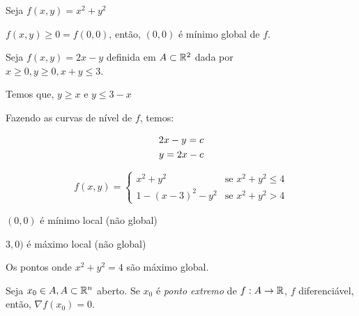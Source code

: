 \documentclass{book}
\begin{document}
\begin{ex}
Seja $f\left( {x,y} \right) = x^2  + y^2$
\end{ex}

\begin{sol}
$f\left( {x,y} \right) \geqslant 0 = f\left( {0,0} \right)$, ent\~ao, $\left( {0,0} \right)$ \'e m\'inimo global de $f$.
\end{sol}

\begin{ex}
Seja $f\left( {x,y} \right) = 2x - y$ definida em $A \subset \mathbb{R}^2$ dada por \\
$x \geqslant 0,y \geqslant 0,x + y \leqslant 3$.
\end{ex}

\begin{sol}
Temos que, $y \geqslant x$ e $y \leqslant 3 - x$

Fazendo as curvas de n\'ivel de $f$, temos:

\[
\begin{gathered}
2x - y = c \hfill \\
y = 2x - c \hfill \\
\end{gathered}
\]


\end{sol}

\begin{ex}
\begin{equation*}
f(x,y)=\left\{ \begin{array}{cl}\displaystyle
x^2 + y^2 & \textrm{se }x^2 + y^2 \leqslant 4\\
        1 - \left( {x - 3} \right)^2  - y^2& \textrm{se } x^2 + y^2 > 4 \end{array}\right.
\end{equation*}

\end{ex}

\begin{sol}
$(0,0)$ \'e m\'inimo local (n\~ao global)

$3,0)$ \'e m\'aximo local (n\~ao global)

Os pontos onde $x^2 + y^2 = 4$ s\~ao m\'aximo global.


\end{sol}

\newpage 

\begin{teo}
Seja $x_0 \in A, A \subset \mathbb{R}^n$ aberto. Se $x_0$ \'e \textit{ponto extremo} de $f:A \to \mathbb{R}$, $f$ diferenci\'avel, ent\~ao, $\nabla f\left( {x_0 } \right) = 0$.
\end{teo}
\end{document}
